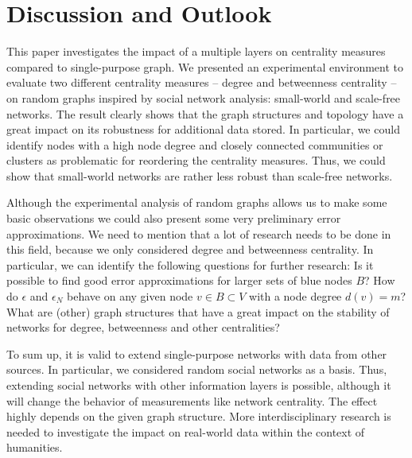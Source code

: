 \section{Discussion and Outlook}

This paper investigates the impact of a multiple layers on centrality measures compared to single-purpose graph. We presented an experimental environment to evaluate two different centrality measures -- degree and betweenness centrality -- on random graphs inspired by social network analysis: small-world and scale-free networks. The result clearly shows  that the graph structures and topology have a great impact on its robustness for additional data stored. In particular, we could identify nodes with a high node degree and closely connected communities or clusters as problematic for reordering the centrality measures. Thus, we could show that small-world networks are rather less robust than scale-free networks. 

Although the experimental analysis of random graphs allows us to make some basic observations we could also present some very preliminary error approximations. %
We need to mention that a lot of research needs to be done in this field, because we only considered degree and betweenness centrality. 
In particular, we can identify the following questions for further research: Is it possible to find good error approximations for larger sets of blue nodes $B$? How do $\epsilon$ and $\epsilon_N$ behave on any given node $v\in B\subset V$ with a node degree $d(v)=m$? What are (other) graph structures that have a great impact on the stability of networks for degree, betweenness and other centralities? 

To sum up, it is valid %
to extend single-purpose networks with data from other sources. In particular, we considered random social networks as a basis. Thus, extending social networks with other information layers is possible, although it will change the behavior of measurements like network centrality. The effect highly depends on the given graph structure. More interdisciplinary research is needed to investigate the impact on real-world data within the context of humanities.

